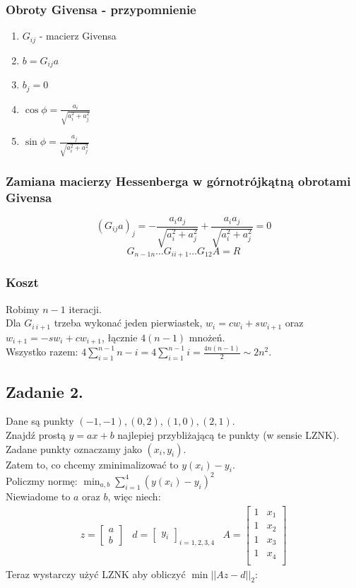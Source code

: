 \documentclass{article}
\begin{document}
\subsubsection{Obroty Givensa - przypomnienie}
\begin{enumerate}
	\item $ G_{ij} $ - macierz Givensa
	\item $ b=G_{ij}a$
	\item $ b_j=0 $
	\item $ \cos\phi = \frac{a_i}{\sqrt{a_i^2+a_j^2}} $
	\item $ \sin\phi = \frac{a_j}{\sqrt{a_i^2+a_j^2}} $
\end{enumerate}

\subsubsection{Zamiana macierzy Hessenberga w górnotrójkątną obrotami Givensa}
$$ (G_{ij}a)_j = -\frac{a_ia_j}{\sqrt{a_i^2 + a_j^2}}+\frac{a_ia_j}{\sqrt{a_i^2 + a_j^2}}=0$$
$$G_{n-1 n}\ldots G_{i i+1}\ldots G_{12}A=R$$
\subsubsection{Koszt}
Robimy $ n-1 $ iteracji.\\
Dla $ G_{i\ i+1} $ trzeba wykonać jeden pierwiastek, $ w_i =cw_i+sw_{i+1}$ oraz $w_{i+1} = -sw_i + cw_{i+1}$, łącznie $4(n-1) $ mnożeń.\\
Wszystko razem: $4\sum_{i=1}^{n-1}n-i=4\sum_{i=1}^{n-1}i=\frac{4n(n-1)}{2}\sim2n^2$.
\subsection{Zadanie 2.}
Dane są punkty $(-1, -1), (0,2), (1, 0), (2, 1)$.\\
Znajdź prostą $ y=ax+b $ najlepiej przybliżającą te punkty (w sensie LZNK).\\
Zadane punkty oznaczamy jako $ (x_i, y_i) $.\\
Zatem to, co chcemy zminimalizować to $y(x_i)-y_i$.\\
Policzmy normę: $ \min_{a, b} \sum_{i=1}^{4}(y(x_i)-y_i)^2$\\
Niewiadome to $ a $ oraz $ b $, więc niech: 
$$ 
\begin{matrix}
	z=\begin{bmatrix}a\\b\end{bmatrix}&
	d=\begin{bmatrix}y_i\end{bmatrix}_{i=1, 2, 3, 4}&
	A=\begin{bmatrix}
		1&x_1\\
		1&x_2\\
		1&x_3\\
		1&x_4\\	
	\end{bmatrix}
\end{matrix}
$$
Teraz wystarczy użyć LZNK aby obliczyć $\min{||Az-d||_2}$:
\end{document}
